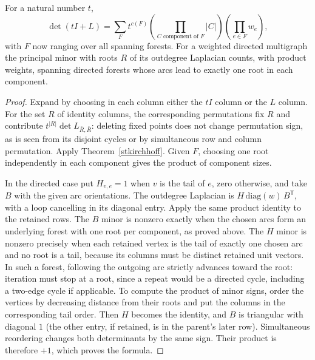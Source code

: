 \begin{corollary}\leavevmode\label{stforestgen}
For a natural number $t$,
\[
 \det(tI+L)=\sum_F t^{c(F)}\left(\prod_{C\text{ component of }F}|C|\right)
                      \left(\prod_{e\in F} w_e\right),
\]
with $F$ now ranging over all spanning forests. For a weighted directed multigraph the principal minor with roots $R$ of its outdegree Laplacian counts, with product weights, spanning directed forests whose arcs lead to exactly one root in each component.
\end{corollary}
\begin{proof}
Expand by choosing in each column either the $tI$ column or the $L$ column. For the set $R$ of identity columns, the corresponding permutations fix $R$ and contribute $t^{|R|}\det L_{\bar R,\bar R}$: deleting fixed points does not change permutation sign, as is seen from its disjoint cycles or by simultaneous row and column permutation. Apply Theorem~\ref{stkirchhoff}. Given $F$, choosing one root independently in each component gives the product of component sizes.

In the directed case put $H_{v,e}=1$ when $v$ is the tail of $e$, zero otherwise, and take $B$ with the given arc orientations. The outdegree Laplacian is $H\,\mathrm{diag}(w)\,B^{\mathsf T}$, with a loop cancelling in its diagonal entry. Apply the same product identity to the retained rows. The $B$ minor is nonzero exactly when the chosen arcs form an underlying forest with one root per component, as proved above. The $H$ minor is nonzero precisely when each retained vertex is the tail of exactly one chosen arc and no root is a tail, because its columns must be distinct retained unit vectors. In such a forest, following the outgoing arc strictly advances toward the root: iteration must stop at a root, since a repeat would be a directed cycle, including a two-edge cycle if applicable. To compute the product of minor signs, order the vertices by decreasing distance from their roots and put the columns in the corresponding tail order. Then $H$ becomes the identity, and $B$ is triangular with diagonal $1$ (the other entry, if retained, is in the parent's later row). Simultaneous reordering changes both determinants by the same sign. Their product is therefore $+1$, which proves the formula.
\end{proof}

